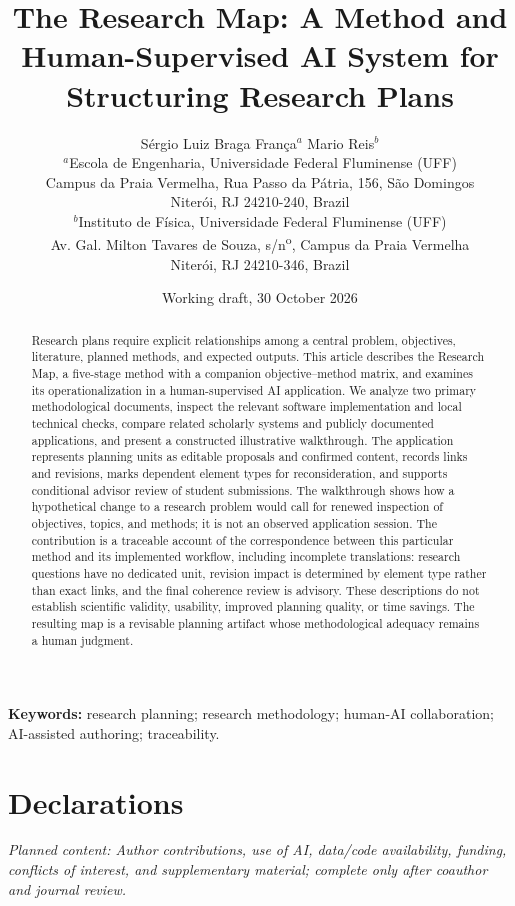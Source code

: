 \documentclass[11pt,a4paper]{article}
\title{The Research Map: A Method and Human-Supervised AI System for Structuring Research Plans}
\author{S{\'e}rgio Luiz Braga Fran\c{c}a$^{a}$ \quad Mario Reis$^{b}$\\[0.6em]
\small $^{a}$Escola de Engenharia, Universidade Federal Fluminense (UFF)\\
\small Campus da Praia Vermelha, Rua Passo da P\'atria, 156, S\~ao Domingos\\
\small Niter\'oi, RJ 24210-240, Brazil\\[0.25em]
\small $^{b}$Instituto de F\'isica, Universidade Federal Fluminense (UFF)\\
\small Av. Gal. Milton Tavares de Souza, s/n\textsuperscript{o}, Campus da Praia Vermelha\\
\small Niter\'oi, RJ 24210-346, Brazil}
\date{Working draft, 30 October 2026}
\newcommand{\outlinenote}[1]{\par\smallskip\noindent\textit{Planned content: #1}\par\medskip}
\begin{document}
\maketitle
\begin{abstract}
Research plans require explicit relationships among a central problem, objectives, literature, planned methods, and expected outputs. This article describes the Research Map, a five-stage method with a companion objective--method matrix, and examines its operationalization in a human-supervised AI application. We analyze two primary methodological documents, inspect the relevant software implementation and local technical checks, compare related scholarly systems and publicly documented applications, and present a constructed illustrative walkthrough. The application represents planning units as editable proposals and confirmed content, records links and revisions, marks dependent element types for reconsideration, and supports conditional advisor review of student submissions. The walkthrough shows how a hypothetical change to a research problem would call for renewed inspection of objectives, topics, and methods; it is not an observed application session. The contribution is a traceable account of the correspondence between this particular method and its implemented workflow, including incomplete translations: research questions have no dedicated unit, revision impact is determined by element type rather than exact links, and the final coherence review is advisory. These descriptions do not establish scientific validity, usability, improved planning quality, or time savings. The resulting map is a revisable planning artifact whose methodological adequacy remains a human judgment.
\end{abstract}
\noindent\textbf{Keywords:} research planning; research methodology; human-AI collaboration; AI-assisted authoring; traceability.









\section*{Declarations}
\outlinenote{Author contributions, use of AI, data/code availability, funding, conflicts of interest, and supplementary material; complete only after coauthor and journal review.}

{\small
{}


}
\end{document}
